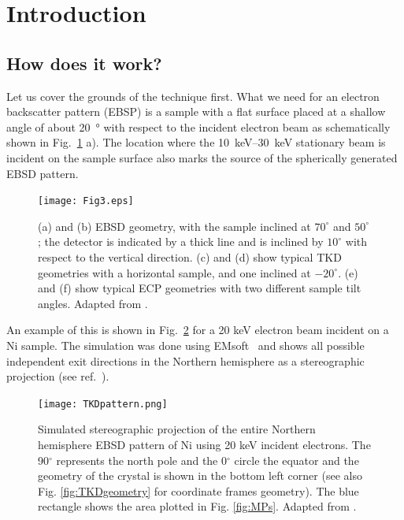 \section{Introduction}


\subsection{How does it work?}
\label{sec:EBSD}

Let us cover the grounds of the technique first. What we need for an electron backscatter pattern (EBSP) is a sample with a flat surface placed at a shallow angle of about \SI{20}{\degree} with respect to the incident electron  beam as schematically shown in Fig.~\ref{fig:geometries} a). The location where the \SIrange{10}{30}{\kilo \electronvolt} stationary beam is incident on  the sample surface also marks the source of the spherically generated EBSD pattern. 

\begin{figure}[ht]
\centering
\texttt{[image: Fig3.eps]}
\caption[EBSD, TKD and ECP set-up geometry.]{(a) and (b) EBSD geometry, with the sample inclined at $70^{\circ}$ and $50^{\circ}$; the detector is indicated by a thick line and is inclined by $10^{\circ}$ with respect to the vertical direction. (c) and (d) show typical TKD geometries with a horizontal sample, and one inclined at $-20^{\circ}$. (e) and (f) show typical ECP geometries with two different sample tilt angles.  Adapted from \cite{PascalTKD}.}
\label{fig:geometries}
\end{figure}

An example of this is shown in Fig.~\ref{fig:tkspatter} for a 20 keV electron beam incident on a Ni sample. The simulation was done using EMsoft~\cite{EMsoft} and shows all possible independent exit directions in the Northern hemisphere as a stereographic projection (see ref.~\cite{degraef2013e}). 

\begin{figure}[ht]
\centering
\texttt{[image: TKDpattern.png]}
\caption[EBSD pattern of Ni northern hemisphere.]{Simulated stereographic projection of the entire Northern hemisphere  EBSD pattern of Ni using 20 keV incident electrons. The 90$^{\circ}$ represents the north pole and the 0$^{\circ}$ circle the equator and the geometry of the crystal is shown in the bottom left corner (see also Fig. \ref{fig:TKDgeometry} for coordinate frames geometry). The blue rectangle shows the area plotted in Fig.  \ref{fig:MPs}. Adapted from \cite{PascalTKD}.}
\label{fig:tkspatter}
\end{figure}


